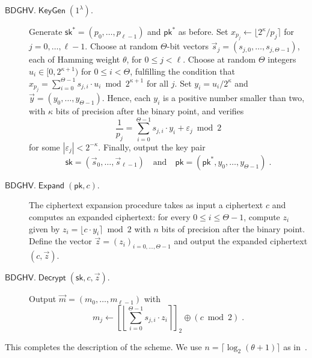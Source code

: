 \documentclass{llncs}
\renewcommand\leq\leqslant
\newcommand{\abs}[1]{\left|#1\right|}
\DeclareMathOperator{\KeyGen}{\ensuremath{\mathsf{KeyGen}}}
\DeclareMathOperator{\Expand}{\ensuremath{\mathsf{Expand}}}
\DeclareMathOperator{\Decrypt}{\ensuremath{\mathsf{Decrypt}}}
\newcommand*{\pk}{\ensuremath{\mathsf{pk}}}
\newcommand*{\sk}{\ensuremath{\mathsf{sk}}}
\newcommand*{\BDGHV}{\ensuremath{\mathsf{BDGHV}}}
\newcommand\ignore[1]{}
\begin{document}
\begin{description}
\item[$\BDGHV.\KeyGen(1^\lambda)$.] Generate
  $\sk^*=(p_0,\ldots,p_{\ell-1})$ and $\pk^*$ as before. Set $x_{p_j}
  \leftarrow \lfloor 2^\kappa/p_j\rceil$ for
  $j=0,\ldots,{\ell-1}$. Choose at random 
  $\Theta$-bit vectors $\vec s_j=(s_{j,0},\ldots,s_{j,\Theta-1})$,
  each of Hamming weight $\theta$, for $0 \leq j < \ell$.
Choose at random $\Theta$ integers $u_i\in[0, 2^{\kappa+1})$ for $0
  \leq i <\Theta$, fulfilling the condition that
$
x_{p_j}=\sum_{i=0}^{\Theta-1}
s_{j,i} \cdot u_{i} \bmod 2^{\kappa+1}$ for all $j$.
Set $y_i=u_i/2^\kappa$ and $\vec y=(y_0,\ldots,y_{\Theta-1})$. Hence,
each $y_i$ is a positive number smaller than two, with $\kappa$ bits
of precision after the binary point, and verifies 
\begin{equation}
\label{eqpj}
\frac{1}{p_j}=\sum_{i=0}^{\Theta-1}
s_{j,i} \cdot y_{i} + \varepsilon_j \bmod 2
\end{equation}
for some $\abs{\varepsilon_j}<2^{-\kappa}$. Finally, output the key pair
$$\sk=(\vec s_0,\ldots,\vec s_{\ell-1}) \quad \text{and} \quad \pk = (\pk^*, y_0, \ldots, y_{\Theta-1})\;.$$
\item[$\BDGHV.\Expand(\pk, c)$.] The ciphertext expansion procedure takes
  as input a ciphertext $c$ and computes an expanded
  ciphertext: for every $0\leq i\leq \Theta-1$, compute $z_i$ given by
$ z_i = \lfloor c\cdot y_i\rceil \bmod 2 $
with $n$ bits of precision after the binary point. Define the vector $\vec z=(z_i)_{i=0,\ldots,\Theta-1}$ and output the expanded ciphertext $(c, \vec z)$.
\\\vspace{-0.25cm}
\item[$\BDGHV.\Decrypt(\sk, c, \vec z)$.] Output $\vec
  m=(m_0,\ldots,m_{\ell-1})$ with 
\begin{equation}
\label{eq:decrypt}
m_j \leftarrow\left[\left\lfloor\sum_{i=0}^{\Theta-1}
s_{j,i} \cdot z_{i}\right\rceil\right]_2 \oplus
(c \bmod 2)\;. 
\end{equation}
\end{description}
This completes the description of the scheme. 
We
use $n=\lceil \log_2 (\theta+1) \rceil$ as in~\cite{CMNT2011}.\ignore{; the
proof of the following Lemma is  the same as in~\cite[Appendix~E]{CMNT2011}.

\begin{lemma}The BDGHV encryption scheme is correct for the set $C(\mathcal {P_E})$ of
  circuits that compute permitted polynomials.\end{lemma} 

\begin{remark}
To reduce the size of the public key we can generate all the $y_i$'s
pseudo-randomly as in~\cite{CMNT2011},  
except $\ell$ of them in order to satisfy Equation~\eqref{eqpj} for
all $0 \leq j < \ell$.
\end{remark}
}
\end{document}
